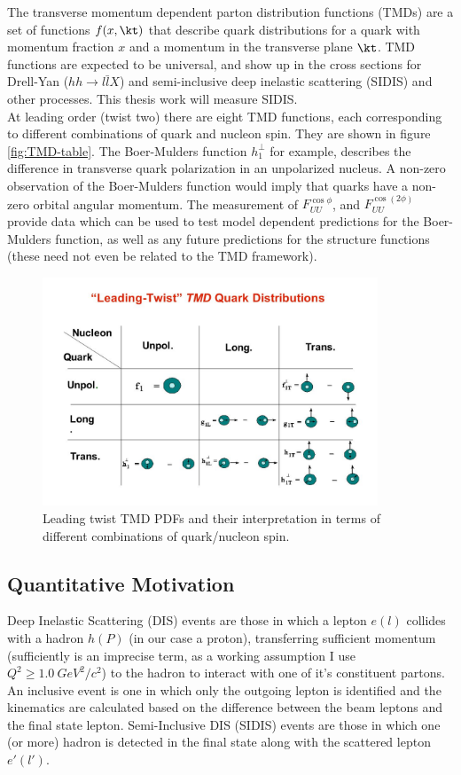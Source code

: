The transverse momentum dependent parton distribution functions (TMDs) are a set of functions $f(x,\kt)$ that describe quark distributions for a quark with momentum fraction $x$ and a momentum in the transverse plane $\kt$.  TMD functions are expected to be universal, and show up in the cross sections for Drell-Yan ($hh \rightarrow l \bar{l}X$) and semi-inclusive deep inelastic scattering (SIDIS) and other processes.  This thesis work will measure SIDIS.  \\

At leading order (twist two) there are eight TMD functions, each corresponding to different combinations of quark and nucleon spin.  They are shown in figure \ref{fig:TMD-table}.  The Boer-Mulders function $h_{1}^{\perp}$ for example, describes the difference in transverse quark polarization in an unpolarized nucleus.  A non-zero observation of the Boer-Mulders function would imply that quarks have a non-zero orbital angular momentum.  The measurement of $F_{UU}^{\cos\phi}$, and $F_{UU}^{\cos(2\phi)}$ provide data which can be used to test model dependent predictions for the Boer-Mulders function, as well as any future predictions for the structure functions (these need not even be related to the TMD framework).  

\begin{figure}
  \centering
  \includegraphics[width=10cm]{image/TMD-table.jpg}
  \caption{Leading twist TMD PDFs and their interpretation in terms of different combinations of quark/nucleon spin.}
  \label{fig:tmd-table}
\end{figure}

\subsection{Quantitative Motivation}

Deep Inelastic Scattering (DIS) events are those in which a lepton $e(l)$ collides with a hadron $h(P)$ (in our case a proton), transferring sufficient momentum (sufficiently is an imprecise term, as a working assumption I use $Q^{2} \geq 1.0 \: GeV^{2}/c^{2}$) to the hadron to interact with one of it's constituent partons.  An inclusive event is one in which only the outgoing lepton is identified and the kinematics are calculated based on the difference between the beam leptons and the final state lepton.  Semi-Inclusive DIS (SIDIS) events are those in which one (or more) hadron is detected in the final state along with the scattered lepton $e'(l')$.  

